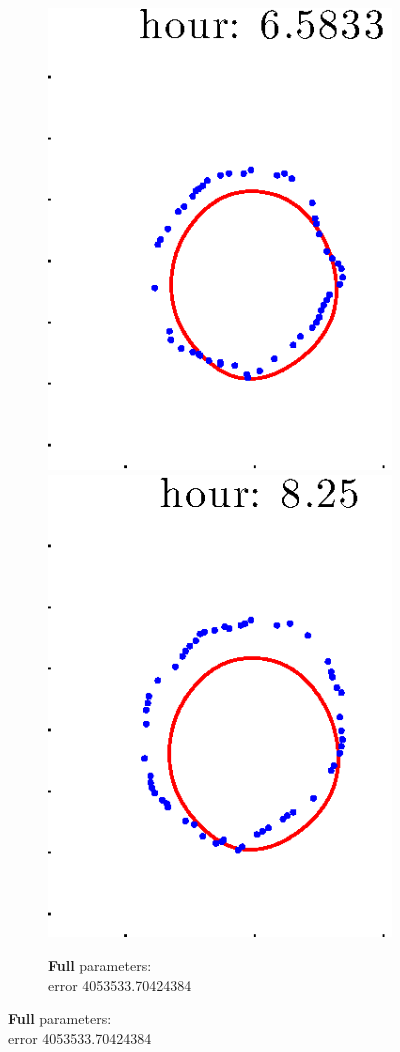 \documentclass[12pt]{article}
\begin{document}
\begin{figure}[h!]
\begin{subfigure}[b]{.3\textwidth}
		\includegraphics[height=.15\textheight]{Pos14exp8/full/full5.eps}
		\includegraphics[height=.15\textheight]{Pos14exp8/full/full6.eps}
		\caption{\textbf{Full} parameters: \\error 4053533.70424384}

\end{subfigure}
\end{figure}
\end{document}
